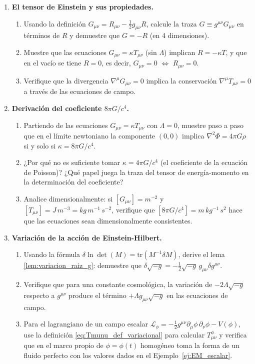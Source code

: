 \begin{enumerate}[leftmargin=2em, label=\textbf{P\thechapter.\arabic*.}]
  \item \textbf{El tensor de Einstein y sus propiedades.}
  \begin{enumerate}[label=(\alph*)]
    \item Usando la definición $G_{\mu\nu} = R_{\mu\nu} - \frac{1}{2}g_{\mu\nu}R$, calcule la traza $G \equiv g^{\mu\nu}G_{\mu\nu}$ en términos de $R$ y demuestre que $G = -R$ (en 4 dimensiones).
    \item Muestre que las ecuaciones $G_{\mu\nu} = \kappa T_{\mu\nu}$ (sin $\Lambda$) implican $R = -\kappa T$, y que en el vacío se tiene $R = 0$, es decir, $G_{\mu\nu} = 0$ $\Leftrightarrow$ $R_{\mu\nu} = 0$.
    \item Verifique que la divergencia $\nabla^\mu G_{\mu\nu} = 0$ implica la conservación $\nabla^\mu T_{\mu\nu} = 0$ a través de las ecuaciones de campo.
  \end{enumerate}

  \item \textbf{Derivación del coeficiente $8\pi G/c^4$.}
  \begin{enumerate}[label=(\alph*)]
    \item Partiendo de las ecuaciones $G_{\mu\nu} = \kappa T_{\mu\nu}$ con $\Lambda = 0$, muestre paso a paso que en el límite newtoniano la componente $(0,0)$ implica $\nabla^2\Phi = 4\pi G\rho$ si y solo si $\kappa = 8\pi G/c^4$.
    \item ¿Por qué no es suficiente tomar $\kappa = 4\pi G/c^4$ (el coeficiente de la ecuación de Poisson)? ¿Qué papel juega la traza del tensor de energía-momento en la determinación del coeficiente?
    \item Analice dimensionalmente: si $[G_{\mu\nu}] = \si{m^{-2}}$ y $[T_{\mu\nu}] = \si{J\,m^{-3}} = \si{kg\,m^{-1}\,s^{-2}}$, verifique que $[8\pi G/c^4] = \si{m\,kg^{-1}\,s^2}$ hace que las ecuaciones sean dimensionalmente consistentes.
  \end{enumerate}

  \item \textbf{Variación de la acción de Einstein-Hilbert.}
  \begin{enumerate}[label=(\alph*)]
    \item Usando la fórmula $\delta\ln\det(M) = \mathrm{tr}(M^{-1}\delta M)$, derive el lema \ref{lem:variacion_raiz_g}: demuestre que $\delta\sqrt{-g} = -\frac{1}{2}\sqrt{-g}\,g_{\mu\nu}\delta g^{\mu\nu}$.
    \item Verifique que para una constante cosmológica, la variación de $-2\Lambda\sqrt{-g}$ respecto a $g^{\mu\nu}$ produce el término $+\Lambda g_{\mu\nu}\sqrt{-g}$ en las ecuaciones de campo.
    \item Para el lagrangiano de un campo escalar $\mathcal{L}_\phi = -\frac{1}{2}g^{\mu\nu}\partial_\mu\phi\,\partial_\nu\phi - V(\phi)$, use la definición \eqref{eq:Tmunu_def_variacional} para calcular $T_{\mu\nu}^\phi$ y verifica que en el marco propio de $\phi = \phi(t)$ homogéneo toma la forma de un fluido perfecto con los valores dados en el Ejemplo~\ref{ej:EM_escalar}.
  \end{enumerate}


\end{enumerate}
